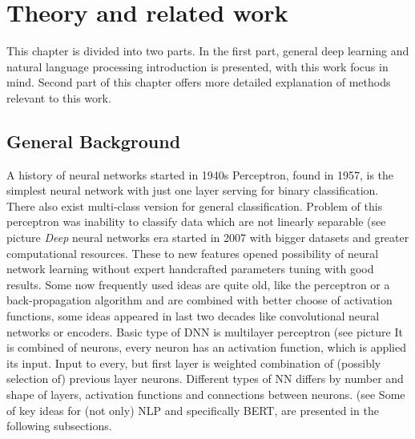 \chapter{Theory and related work}
\label{chap:theandme}
This chapter is divided into two parts. In the first part, general deep learning and natural language processing introduction is presented, with this work focus in mind. Second part of this chapter offers more detailed explanation of methods relevant to this work.

\section{General Background}
A history of neural networks started in 1940s %
Perceptron, found in 1957, is the simplest neural network with just one layer serving for binary classification. There also exist multi-class version for general classification. Problem of this perceptron was inability to classify data which are not linearly separable (see picture %
\textit{Deep} neural networks era started in 2007 with bigger datasets and greater computational resources. These to new features opened possibility of neural network learning without expert handcrafted parameters tuning with good results.
Some now frequently used ideas are quite old, like the perceptron or a back-propagation algorithm and are combined with better choose of activation functions, some ideas appeared in last two decades like convolutional neural networks or encoders.
Basic type of DNN is multilayer perceptron (see picture %
It is combined of neurons, every neuron has an activation function, which is applied its input. Input to every, but first layer is weighted combination of (possibly selection of) previous layer neurons. 
Different types of NN differs by number and shape of layers, activation functions and connections between neurons. (see %
Some of key ideas for (not only) NLP and specifically BERT, are presented in the following subsections.
